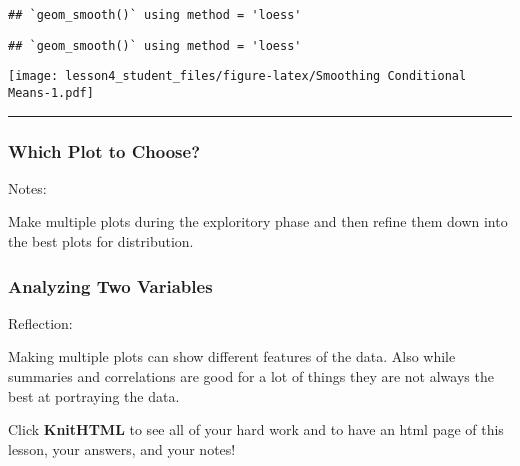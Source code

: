 \documentclass[]{article}
\begin{document}
\begin{verbatim}
## `geom_smooth()` using method = 'loess'
\end{verbatim}

\begin{verbatim}
## `geom_smooth()` using method = 'loess'
\end{verbatim}

\texttt{[image: lesson4\_student\_files/figure-latex/Smoothing Conditional Means-1.pdf]}

\begin{center}\rule{0.5\linewidth}{\linethickness}\end{center}

\subsubsection{Which Plot to Choose?}\label{which-plot-to-choose}

Notes:

Make multiple plots during the exploritory phase and then refine them
down into the best plots for distribution.

\subsubsection{Analyzing Two Variables}\label{analyzing-two-variables}

Reflection:

Making multiple plots can show different features of the data. Also
while summaries and correlations are good for a lot of things they are
not always the best at portraying the data.

Click \textbf{KnitHTML} to see all of your hard work and to have an html
page of this lesson, your answers, and your notes!
\end{document}
